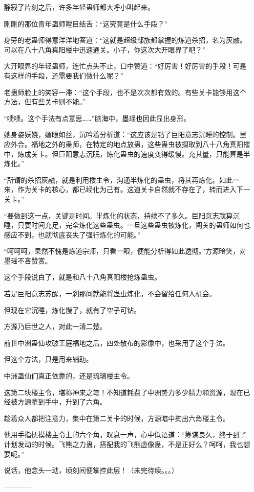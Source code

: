 \begin{this_body}
静寂了片刻之后，许多年轻蛊师都大呼小叫起来。

刚刚的那位青年蛊师瞠目结舌：“这究竟是什么手段？”

身旁的老蛊师得意洋洋地答道：“这就是超级部族都掌握的炼道杀招，名为灰融。可以在八十八角真阳楼中迅速通关。小子，你这次大开眼界了吧？”

大开眼界的年轻蛊师，连忙点头不止，口中赞道：“好厉害！好厉害的手段！可是有这样的手段，还需要我们做什么呢？”

老蛊师脸上的笑容一滞：“这个手段，也不是次次都有效的。有些关卡能够用这个方法，但有些关卡则不能。”

“啧啧。这个手法有点意思……”脑海中，墨瑶也因此显出身形。

她身姿妖娆，媚眼如丝，沉吟着分析道：“这应该是钻了巨阳意志沉睡的控制。里应外合。福地之外的蛊师，在特定的地点放蛊，这些蛊虫被摄取到八十八角真阳楼中，炼成关卡。但巨阳意志沉眠，炼化蛊虫的速度变得缓慢。充其量，只能算是半炼化。”

“所谓的杀招灰融，就是利用楼主令，沟通半炼化的蛊虫，将其再炼化。如此一来，作为关卡的核心，都已经化为己有。这道关卡自然就不存在了，转而进入下一关卡。”

“要做到这一点，关键是时间。半炼化的状态，持续不了多久。巨阳意志就算沉睡，只要时间充足，完全炼化这些蛊虫。一旦这些蛊虫被炼化，闯关的蛊师如何也感应不到，也就彻底丧失了强行炼化的可能。”

“呵呵呵，果然不愧是炼道宗师，只看一眼，便能分析得如此透彻。”方源暗笑，对墨瑶不吝赞赏。

这个手段说白了，就是和八十八角真阳楼抢炼蛊虫。

若是巨阳意志苏醒，一刹那间就能将蛊虫炼化，不会留给任何人机会。

但现在它沉睡，炼化慢了，就有了空子可钻。

方源乃后世之人，对此一清二楚。

前世中洲蛊仙攻破王庭福地之后，四处散布的影像中，也采用了这个手法。

但这个方法，只是用来辅助。

中洲蛊仙们真正依靠的，还是琉璃楼主令。

这第二块楼主令，堪称神来之笔！不知道耗费了中洲势力多少精力和资源，现在已经被方源拿到手中，升到了六角。

趁着众人都把注意力，集中在第二关卡的时候，方源暗中掏出六角楼主令。

他用手指抚摸楼主令上的六个角，叹息一声，心中低语道：“筹谋良久，终于到了计划发动的时候。飞熊之力蛊，搭配我的飞熊虚像蛊，不是正好么？呵呵，我也想要呢。”

说话，他念头一动，顷刻间便掌控此层！（未完待续。。。）

------------

\end{this_body}

